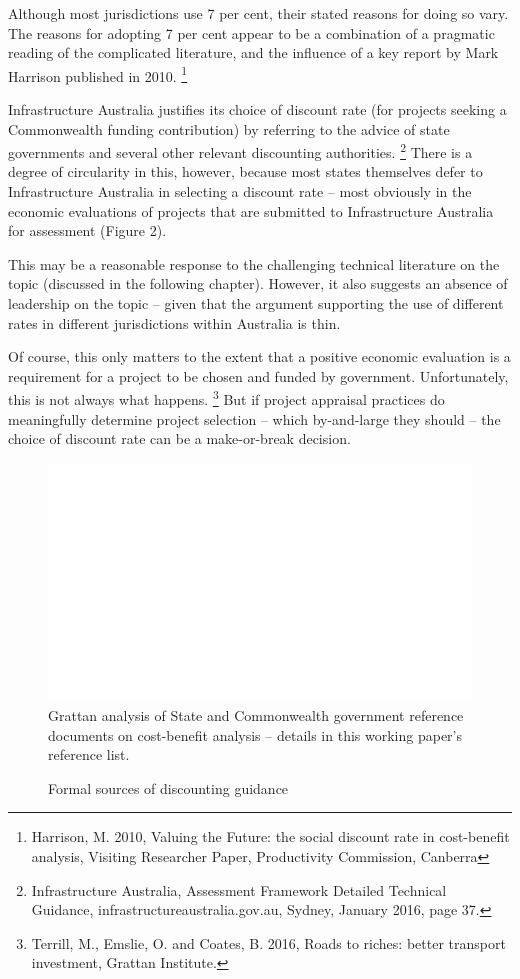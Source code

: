 Although most jurisdictions use 7 per cent, their stated reasons for doing so vary. The reasons for adopting 7 per cent appear to be a combination of a pragmatic reading of the complicated literature, and the influence of a key report by Mark Harrison published in 2010.%
    \footnote{Harrison, M. 2010, Valuing the Future: the social discount rate in cost-benefit analysis, Visiting Researcher Paper, Productivity Commission, Canberra}

Infrastructure Australia justifies its choice of discount rate (for projects seeking a Commonwealth funding contribution) by referring to the advice of state governments and several other relevant discounting authorities.%
    \footnote{Infrastructure Australia, Assessment Framework Detailed Technical Guidance, infrastructureaustralia.gov.au, Sydney, January 2016, page 37.}
There is a degree of circularity in this, however, because most states themselves defer to Infrastructure Australia in selecting a discount rate – most obviously in the economic evaluations of projects that are submitted to Infrastructure Australia for assessment (Figure 2). 

This may be a reasonable response to the challenging technical literature on the topic (discussed in the following chapter). However, it also suggests an absence of leadership on the topic – given that the argument supporting the use of different rates in different jurisdictions within Australia is thin.

Of course, this only matters to the extent that a positive economic evaluation is a requirement for a project to be chosen and funded by government. Unfortunately, this is not always what happens.%
    \footnote{Terrill, M., Emslie, O. and Coates, B. 2016, Roads to riches: better transport investment, Grattan Institute.}
But if project appraisal practices do meaningfully determine project selection -- which by-and-large they should -- the choice of discount rate can be a make-or-break decision. 

\begin{figure}
\caption{Formal sources of discounting guidance \label{<cross-reference key>}}%
\units{}
\includegraphics[page=5]{Charts/ChartPackDiscountRates.pdf}
%
{Grattan analysis of State and Commonwealth government reference documents on cost-benefit analysis – details in this working paper’s reference list.}
\end{figure}